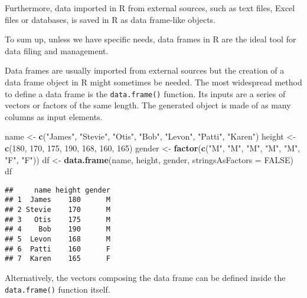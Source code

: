 \documentclass[]{book}
\newenvironment{Shaded}{\begin{snugshade}}{\end{snugshade}}
\newcommand{\KeywordTok}[1]{\textcolor[rgb]{0.13,0.29,0.53}{\textbf{{#1}}}}
\newcommand{\DataTypeTok}[1]{\textcolor[rgb]{0.13,0.29,0.53}{{#1}}}
\newcommand{\DecValTok}[1]{\textcolor[rgb]{0.00,0.00,0.81}{{#1}}}
\newcommand{\StringTok}[1]{\textcolor[rgb]{0.31,0.60,0.02}{{#1}}}
\newcommand{\OtherTok}[1]{\textcolor[rgb]{0.56,0.35,0.01}{{#1}}}
\newcommand{\NormalTok}[1]{{#1}}
\begin{document}
Furthermore, data imported in R from external sources, such as text
files, Excel files or databases, is saved in R as data frame-like
objects.

To sum up, unless we have specific needs, data frames in R are the ideal
tool for data filing and management.

Data frames are usually imported from external sources but the creation
of a data frame object in R might sometimes be needed. The most
widespread method to define a data frame is the \texttt{data.frame()}
function. Its inputs are a series of vectors or factors of the same
length. The generated object is made of as many columns as input
elements.

\begin{Shaded}
\begin{Highlighting}[]
\NormalTok{name <-}\StringTok{ }\KeywordTok{c}\NormalTok{(}\StringTok{"James"}\NormalTok{, }\StringTok{"Stevie"}\NormalTok{, }\StringTok{"Otis"}\NormalTok{, }\StringTok{"Bob"}\NormalTok{, }\StringTok{"Levon"}\NormalTok{, }\StringTok{"Patti"}\NormalTok{, }\StringTok{"Karen"}\NormalTok{)}
\NormalTok{height <-}\StringTok{ }\KeywordTok{c}\NormalTok{(}\DecValTok{180}\NormalTok{, }\DecValTok{170}\NormalTok{, }\DecValTok{175}\NormalTok{, }\DecValTok{190}\NormalTok{, }\DecValTok{168}\NormalTok{, }\DecValTok{160}\NormalTok{, }\DecValTok{165}\NormalTok{)}
\NormalTok{gender <-}\StringTok{ }\KeywordTok{factor}\NormalTok{(}\KeywordTok{c}\NormalTok{(}\StringTok{"M"}\NormalTok{, }\StringTok{"M"}\NormalTok{, }\StringTok{"M"}\NormalTok{, }\StringTok{"M"}\NormalTok{, }\StringTok{"M"}\NormalTok{, }\StringTok{"F"}\NormalTok{, }\StringTok{"F"}\NormalTok{))}
\NormalTok{df <-}\StringTok{ }\KeywordTok{data.frame}\NormalTok{(name, height, gender, }\DataTypeTok{stringsAsFactors =} \OtherTok{FALSE}\NormalTok{)}
\NormalTok{df}
\end{Highlighting}
\end{Shaded}

\begin{verbatim}
##     name height gender
## 1  James    180      M
## 2 Stevie    170      M
## 3   Otis    175      M
## 4    Bob    190      M
## 5  Levon    168      M
## 6  Patti    160      F
## 7  Karen    165      F
\end{verbatim}

Alternatively, the vectors composing the data frame can be defined
inside the \texttt{data.frame()} function itself.
\end{document}
